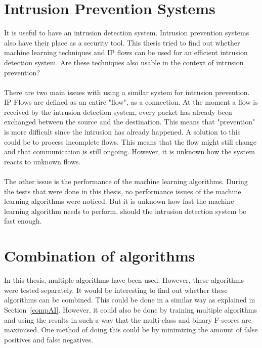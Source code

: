 \section{Intrusion Prevention Systems}
It is useful to have an intrusion detection system. Intrusion prevention systems also have their place as a security tool. This thesis tried to find out whether machine learning techniques and IP flows can be used for an efficient intrusion detection system. Are these techniques also usable in the context of intrusion prevention? \\
\\
There are two main issues with using a similar system for intrusion prevention. IP Flows are defined as an entire "flow", as a connection. At the moment a flow is received by the intrusion detection system, every packet has already been exchanged between the source and the destination. This means that "prevention" is more difficult since the intrusion has already happened. A solution to this could be to process incomplete flows. This means that the flow might still change and that communication is still ongoing. However, it is unknown how the system reacts to unknown flows. \\
\\
The other issue is the performance of the machine learning algorithms. During the tests that were done in this thesis, no performance issues of the machine learning algorithms were noticed. But it is unknown how fast the machine learning algorithm needs to perform, should the intrusion detection system be fast enough.

\section{Combination of algorithms}
In this thesis, multiple algorithms have been used. However, these algorithms were tested separately. It would be interesting to find out whether these algorithms can be combined. This could be done in a similar way as explained in Section~\ref{compAI}. However, it could also be done by training multiple algorithms and using the results in such a way that the multi-class and binary F-scores are maximised. One method of doing this could be by minimizing the amount of false positives and false negatives. 
